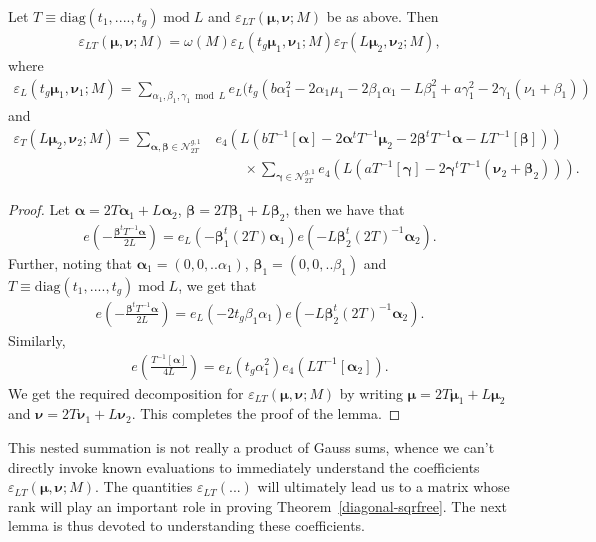 \documentclass[11pt]{amsart}
\numberwithin{equation}{section}
\newcommand{\mc}{\mathcal}
\newcommand{\mrm}{\mathrm} %
\renewcommand*{\mod}{\operatorname{mod}}
\newcommand{\q}{\quad}
\begin{document}
\begin{lemma}\label{lem:varepssplit}
    Let $T\equiv \mrm{diag}(t_1, ....,t_g)\mod L$ and $\varepsilon_{LT}(\bm\mu, \bm\nu;M)$ be as above. Then
\begin{align}
    \varepsilon_{LT}(\bm\mu, \bm\nu;M)= \omega(M)\varepsilon_{L}(t_g\bm\mu_1, \bm\nu_1;M)\varepsilon_{T}(L\bm\mu_2, \bm\nu_2;M),
\end{align}
where
\begin{align}
\varepsilon_{L}(t_g\bm\mu_1, \bm\nu_1;M)=\sum_{\alpha_1,\beta_1,\gamma_1\bmod L}e_L(t_g(b\alpha_1^2-2\alpha_1\mu_1-2\beta_1\alpha_1-L\beta_1^2+a\gamma_1^2-2\gamma_1(\nu_1+\beta_1))    
\end{align}
and
\begin{align}
\varepsilon_{T}(L\bm\mu_2, \bm\nu_2;M)= \sum_{\bm{\alpha}, \bm{\beta}\in \mc N_{2T}^{g,1}} &e_4\left(L(b T^{-1}[\bm{\alpha}]-2\bm{\alpha}^tT^{-1}\bm\mu_2-2\bm{\beta}^tT^{-1}\bm{\alpha}-LT^{-1}[\bm{\beta}])\right)\\
&\q\q\times\sum_{\bm\gamma\in \mc N_{2T}^{g,1}}e_4\left(L(aT^{-1}[\bm\gamma]-2\bm\gamma^tT^{-1}(\bm\nu_2+\bm{\beta}_2))\right).   
\end{align}
\end{lemma}
\begin{proof}
Let $\bm\alpha=2T\bm{\alpha}_1+L\bm\alpha_2$, $\bm\beta=2T\bm{\beta}_1+L\bm\beta_2$, then we have that
\begin{align}
e\left(-\frac{\bm\beta^tT^{-1}\bm\alpha}{2L}\right)=e_L(-\bm\beta_1^t(2T)\bm\alpha_1)e(-L\bm\beta_2^t(2T)^{-1}\bm\alpha_2).   
\end{align}
Further, noting that $\bm\alpha_1=(0,0,..\alpha_1)$, $\bm\beta_1=(0,0,..\beta_1)$ and $T\equiv \mrm{diag}(t_1, ....,t_g)\mod L$, we get that
\begin{align}
e\left(-\frac{\bm\beta^tT^{-1}\bm\alpha}{2L}\right)=e_L(-2t_g\beta_1\alpha_1)e(-L\bm\beta_2^t(2T)^{-1}\bm\alpha_2).   
\end{align}
Similarly,
\begin{align}
e\left(\frac{T^{-1}[\bm\alpha]}{4L}\right)=e_L(t_g\alpha_1^2)e_4(LT^{-1}[\bm\alpha_2]).   
\end{align}
We get the required decomposition for $\varepsilon_{LT}(\bm\mu, \bm\nu;M)$ by writing  $\bm\mu=2T\bm\mu_1+L\bm\mu_2$ and $\bm\nu=2T\bm\nu_1+L\bm\nu_2$. This completes the proof of the lemma.
\end{proof}
%
\begin{remark}
 This nested summation is not really a product of Gauss sums, whence we can't directly invoke known evaluations to immediately understand the coefficients $\varepsilon_{LT}(\bm\mu, \bm\nu;M)$. The quantities $\varepsilon_{LT}(...)$ will ultimately lead us to a matrix whose rank will play an important role in proving Theorem~\ref{diagonal-sqrfree}. The next lemma is thus devoted to understanding these coefficients.
\end{remark}
\end{document}
